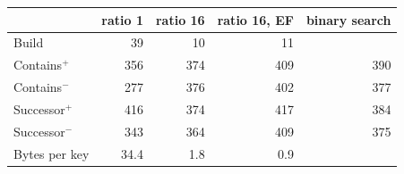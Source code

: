 \begin{tabular}{lrrrr}
&\multicolumn{1}{c}{ratio 1}&\multicolumn{1}{c}{ratio 16}&\multicolumn{1}{c}{ratio 16, EF}&\multicolumn{1}{c}{binary search}\\
\hline
Build & 39 & 10 & 11 & \\
Contains$^+$ & 356 & 374 & 409 & 390\\
Contains$^-$ & 277 & 376 & 402 & 377\\
Successor$^+$ & 416 & 374 & 417 & 384\\
Successor$^-$ & 343 & 364 & 409 & 375\\
\hline
Bytes per key & 34.4 & 1.8 & 0.9 & \\
\end{tabular}
